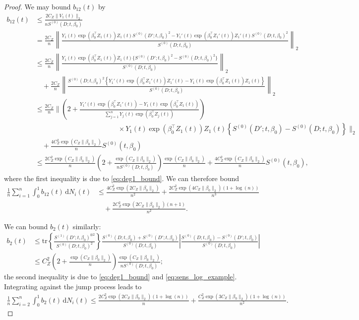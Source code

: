 \documentclass[10pt,a4paper]{amsart}
\newcommand{\dint}{\,\mathrm{d}}
\begin{document}
\begin{proof}
We may bound $b_{12}(t)$ by 
\begin{align*}
    b_{12}(t) &\leq \frac{2 C_Z \|V_1(t)\|_2}{nS^{(0)}(D; t, \beta_0)} \\
    &= \frac{2C_Z}{n}  \left\| \frac{ Y_1(t) \exp(\beta_0^\top Z_1(t)) Z_1(t) S^{(0)}(D'; t, \beta_0)^2 - Y_1'(t) \exp(\beta_0^\top Z_1'(t)) Z_1'(t) S^{(0)}(D; t, \beta_0)^2}{S^{(0)}(D; t, \beta_0)}\right\|_2 \\
    &\leq \frac{2C_Z}{n} \left\|\frac{Y_1(t) \exp(\beta_0^\top Z_1(t)) Z_1(t) \{S^{(0)}(D'; t, \beta_0)^2-S^{(0)}(D; t, \beta_0)^2\}}{S^{(0)}(D; t, \beta_0)} \right\|_2 \\
    &\quad + \frac{2 C_Z}{n} \left\| \frac{S^{(0)}(D; t, \beta_0)^2 \left\{ Y_1'(t) \exp(\beta_0^\top Z_1'(t)) Z_1'(t) - Y_1(t) \exp(\beta_0^\top Z_1(t)) Z_1(t) \right\}}{S^{(0)}(D; t, \beta_0)}\right\|_2\\
    &\leq  \frac{2C_Z}{n}  \Bigg\| \left(2+\frac{Y_1'(t) \exp(\beta_0^\top Z_1'(t)) - Y_1(t) \exp(\beta_0^\top Z_1(t))}{\sum_{j=1}^n Y_j(t) \exp(\beta_0^\top Z_j(t))} \right) \\
    &\hspace{5cm} \times Y_1(t) \exp(\beta_0^\top Z_1(t)) Z_1(t) \left\{S^{(0)}(D'; t, \beta_0) -S^{(0)}(D; t, \beta_0) \right\} \Bigg\|_2 \\
    &\quad +  \frac{4 C_Z^2 \exp(C_Z\|\beta_0\|_2)}{n} S^{(0)}(t, \beta_0) \\
    &\leq \frac{2C_Z^2 \exp(C_Z \|\beta_0\|_2)}{n} \left( 2+ \frac{\exp(C_Z \|\beta_0\|_2)}{n S^{(0)}(D; t, \beta_0)}\right) \frac{\exp(C_Z \|\beta_0\|_2)}{n} + \frac{4 C_Z^2 \exp(C_Z\|\beta_0\|_2)}{n} S^{(0)}(t, \beta_0) , 
\end{align*}
where the first inequality is due to \eqref{eq:deg1_bound}. We can therefore bound
\begin{align*}
    \frac{1}{n}\sum_{i=1}^n \int_0^1 b_{12}(t) \dint N_i(t) &\leq \frac{4C_Z^2 \exp(2C_Z\|\beta_0\|_2)}{n^2} + \frac{2C_Z^2 \exp(4C_Z\|\beta_0\|_2 )(1+\log(n))}{n^3} \\
    &\quad +\frac{2 C_Z^2 \exp(2C_Z\|\beta_0\|_2)(n+1)}{n^2}.  
\end{align*}

We can bound $b_2(t)$ similarly:
\begin{align*}
    b_2(t) &\leq \mathrm{tr}\left\{ \frac{S^{(1)}(D'; t, \beta_0)^{\otimes 2}}{S^{(0)}(D;t, \beta_0)^2}\right\}  \frac{S^{(0)}(D; t, \beta_0)+S^{(0)}(D'; t, \beta_0)}{S^{(0)}(D; t, \beta_0)} \left|\frac{S^{(0)}(D; t, \beta_0) - S^{(0)}(D'; t, \beta_0) } {S^{(0)}(D; t, \beta_0)} \right|\\
    &\leq C_Z^2 \left(2 + \frac{ \exp(C_Z\|\beta_0\|_2)}{n} \right) \frac{\exp(C_Z\|\beta_0\|_2)}{nS^{(0)}(D; t, \beta_0)};
\end{align*}
the second inequality is due to \eqref{eq:deg1_bound} and \eqref{eq:sens_log_example}. Integrating against the jump process leads to
\begin{align*}
    \frac{1}{n} \sum_{i=2}^n \int_0^1 b_2(t) \dint N_i(t) \leq \frac{2C_Z^2 \exp(2C_Z \|\beta_0\|_2)(1+ \log(n))}{n} + \frac{C_Z^2 \exp(3C_Z\|\beta_0\|_2)(1+\log(n))}{n^2}. 
\end{align*}


\end{proof}
\end{document}
